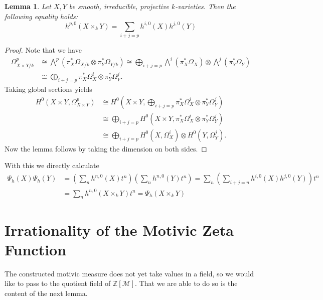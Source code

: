 \documentclass[11pt, a4paper, german]{article}
\theoremstyle{plain}
\newtheorem{lemma}[theorem]{Lemma}
\theoremstyle{definition}
\begin{document}
\begin{lemma}
    Let $X,Y$ be smooth, irreducible, projective $k$-varieties. Then the following equality holds:
    \[
        h^{p,0}(X \times_k Y) = \sum_{i+j=p} h^{i,0}(X)h^{j,0}(Y)
    \]
\end{lemma}
\begin{proof}
    Note that we have 
    \begin{align*}
        \Omega_{X \times Y / k}^p & \cong {\bigwedge}^p(\pi_X^*\Omega_{X/k} \otimes \pi_Y^* \Omega_{Y/k}) 
                                    \cong \bigoplus_{i+j = p} {\bigwedge}^i(\pi_X^*\Omega_X)  \otimes {\bigwedge}^j(\pi_Y^*\Omega_Y)\\
                                  & \cong \bigoplus_{i+j = p} \pi_X^*\Omega^i_X \otimes \pi_Y^*\Omega^j_Y.
    \end{align*}
    Taking global sections yields
    \begin{align*}
        H^0(X \times Y, \Omega_{X \times Y}^p) &\cong H^0(X \times Y, \bigoplus_{i+j = p} \pi_X^*\Omega^i_X \otimes \pi_Y^*\Omega^j_Y)\\
        &\cong \bigoplus_{i+j = p} H^0(X \times Y, \pi_X^*\Omega^i_X \otimes \pi_Y^*\Omega^j_Y) \\
        & \cong \bigoplus_{i+j = p} H^0(X, \Omega^i_X) \otimes H^0(Y, \Omega^j_Y).
    \end{align*}
    Now the lemma follows by taking the dimension on both sides.
\end{proof}
With this we directly calculate 
\begin{align*}
    \Psi_h(X)\Psi_h(Y) &= \left( \sum_n h^{n,0}(X)t^n \right) \left( \sum_n h^{n,0}(Y)t^n \right)  
    = \sum_n \left( \sum_{i+j=n} h^{i,0}(X) h^{j,0}(Y) \right )t^n \\ &= \sum_n h^{n,0}(X \times_k Y)t^n = \Psi_h(X \times_k Y)
\end{align*}


\section{Irrationality of the Motivic Zeta Function}
\label{final}
The constructed motivic measure does not yet take values in a field, so we would like to pass to the quotient field of $\mathbb{Z}[\mathcal{M}]$.
That we are able to do so is the content of the next lemma.
\end{document}
